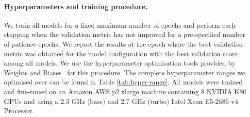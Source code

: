 \documentclass{article}
\begin{document}
\begin{table}[h]
    \centering
    \caption{Hyper-parameter ranges for the discrete and continous models.}
    \label{tab:hyper-range}
\end{table} 


\paragraph{Hyperparameters and training procedure.} We train all models for a fixed maximum number of epochs and perform early stopping when the validation metric has not improved for a pre-specified number of patience epochs. We report the results at the epoch where the best validation metric was obtained for the model configuration with the best validation score among all models. We use the hyperparameter optimisation tools provided by Weights and Biases~\citep{wandb} for this procedure. The complete hyperparameter ranges we optimised over can be found in Table \ref{tab:hyper-range}. All models were trained and fine-tuned on an Amazon AWS p2.xlarge machine containing 8 NVIDIA K80 GPUs and using a 2.3 GHz (base) and 2.7 GHz (turbo) Intel Xeon E5-2686 v4 Processor.
\end{document}
